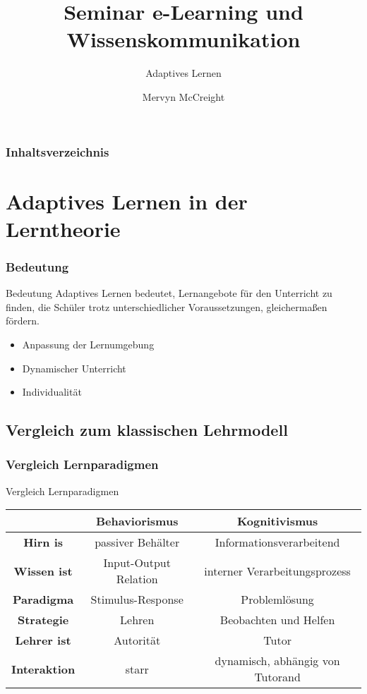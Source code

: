\documentclass{beamer}
\title[Seminar]{Seminar e-Learning und Wissenskommunikation}
\subtitle[Remailer]{Adaptives Lernen}
\author[M. McCreight]{Mervyn McCreight}
\institute[FH-Wedel]{FH-Wedel}
\begin{document}
\frame{\titlepage}

\begin{frame}
	\frametitle{Inhaltsverzeichnis}
	\tableofcontents
\end{frame}

\section{Adaptives Lernen in der Lerntheorie}
  \begin{frame}
    \frametitle{Bedeutung}
    \begin{block}{Bedeutung}
      Adaptives Lernen bedeutet, Lernangebote für den Unterricht zu finden, die Schüler trotz unterschiedlicher Voraussetzungen, gleichermaßen fördern.
    \end{block}

    \centering
    \begin{itemize}
      \item Anpassung der Lernumgebung
      \item Dynamischer Unterricht
      \item Individualität
    \end{itemize}
  \end{frame}
\subsection{Vergleich zum klassischen Lehrmodell}
  \begin{frame}
   \frametitle{Vergleich Lernparadigmen}
   \begin{block}{Vergleich Lernparadigmen}
      \begin{table}[!htbp]
        \centering
        \begin{tabular}{c || c | c}
          \hline
          \  & \textbf{Behaviorismus} & \textbf{Kognitivismus} \\
          \hline
          \textbf{Hirn is} & passiver Behälter & Informationsverarbeitend \\
          \textbf{Wissen ist} & Input-Output Relation & interner Verarbeitungsprozess \\
          \textbf{Paradigma} & Stimulus-Response & Problemlösung  \\
          \textbf{Strategie} & Lehren & Beobachten und Helfen \\
          \textbf{Lehrer ist} & Autorität & Tutor \\
          \textbf{Interaktion} & starr & dynamisch, abhängig von Tutorand \\
        \end{tabular}
      \end{table}
   \end{block}
  \end{frame}
\end{document}
